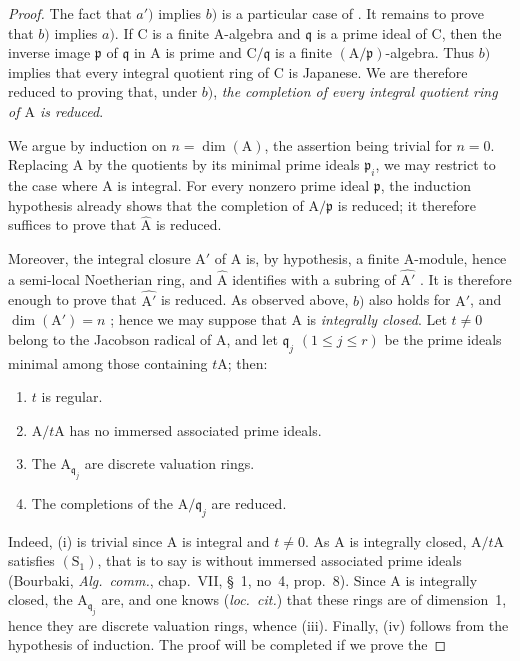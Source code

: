\begin{proof}
The fact that $a')$ implies $b)$ is a particular case of . It remains to prove that $b)$ implies $a)$. If $\mathrm{C}$ is a finite $\mathrm{A}$-algebra and $\mathfrak{q}$ is a prime ideal of $\mathrm{C}$, then the inverse image $\mathfrak{p}$ of $\mathfrak{q}$ in $\mathrm{A}$ is prime and $\mathrm{C}/\mathfrak{q}$ is a finite $(\mathrm{A}/\mathfrak{p})$-algebra. Thus $b)$ implies that every integral quotient ring of $\mathrm{C}$ is Japanese. We are therefore reduced to proving that, under $b)$, \emph{the completion of every integral quotient ring of $\mathrm{A}$ is reduced}.

We argue by induction on $n=\dim(\mathrm{A})$, the assertion being trivial for $n=0$. Replacing $\mathrm{A}$ by the quotients by its minimal prime ideals $\mathfrak{p}_i$, we may restrict to the case where $\mathrm{A}$ is integral. For every nonzero prime ideal $\mathfrak{p}$, the induction hypothesis already shows that the completion of $\mathrm{A}/\mathfrak{p}$ is reduced; it therefore suffices to prove that $\widehat{\mathrm{A}}$ is reduced.

Moreover, the integral closure $\mathrm{A}'$ of $\mathrm{A}$ is, by hypothesis, a finite $\mathrm{A}$-module, hence a semi-local Noetherian ring, and $\widehat{\mathrm{A}}$ identifies with a subring of $\widehat{\mathrm{A}'}$ . It is therefore enough to prove that $\widehat{\mathrm{A}'}$ is reduced. As observed above, $b)$ also holds for $\mathrm{A}'$, and $\dim(\mathrm{A}')=n$ ; hence we may suppose that $\mathrm{A}$ is \emph{integrally closed}. Let $t\neq 0$ belong to the Jacobson radical of $\mathrm{A}$, and let $\mathfrak{q}_j$ $(1\leqslant j\leqslant r)$ be the prime ideals minimal among those containing $t\mathrm{A}$; then:
\begin{enumerate}[label=(\roman*)]
  \item $t$ is regular.
  \item $\mathrm{A}/t\mathrm{A}$ has no immersed associated prime ideals.
  \item The $\mathrm{A}_{\mathfrak{q}_j}$ are discrete valuation rings.
  \item The completions of the $\mathrm{A}/\mathfrak{q}_j$ are reduced.
\end{enumerate}
Indeed, (i) is trivial since $\mathrm{A}$ is integral and $t\neq 0$. As $\mathrm{A}$ is integrally closed, $\mathrm{A}/t\mathrm{A}$ satisfies $(\mathrm{S}_1)$, that is to say  is without immersed associated prime ideals (Bourbaki, \emph{Alg.\ comm.}, chap.~VII, \S~1, no~4, prop.~8). Since $\mathrm{A}$ is integrally
closed, the $\mathrm{A}_{\mathfrak{q}_j}$ are, and one knows (\emph{loc.\ cit.}) that these rings are of dimension~1, hence they are discrete valuation rings, whence (iii). Finally, (iv) follows from the hypothesis of induction. The proof will be completed if we prove the


\end{proof}
